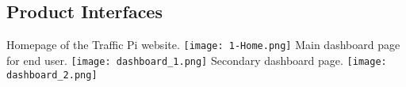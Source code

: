 \subsection{Product Interfaces}
\graphicspath{ {./images/} }
Homepage of the Traffic Pi website.\newline
\texttt{[image: 1-Home.png]}\newline
Main dashboard page for end user.\newline
\texttt{[image: dashboard\_1.png]}\newline
Secondary dashboard page.\newline
\texttt{[image: dashboard\_2.png]}\newline